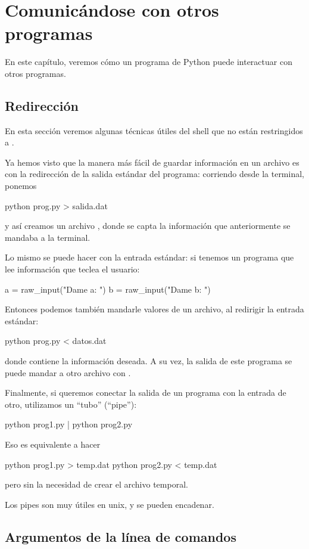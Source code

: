 \chapter{Comunicándose con otros programas}

En este capítulo, veremos cómo un programa de Python puede interactuar con otros programas.

\section{Redirección}

En esta sección veremos algunas técnicas útiles del shell  que no están restringidos a .

Ya hemos visto que la manera más fácil de guardar información en un archivo es con la redirección de la salida estándar del programa: corriendo desde la terminal, ponemos
\begin{python}
python prog.py > salida.dat
\end{python}
y así creamos un archivo , donde se capta la información que anteriormente se mandaba a la terminal.

Lo mismo se puede hacer con la entrada estándar: si tenemos un programa que lee información que teclea el usuario:
\begin{python}
a = raw_input("Dame a: ")
b = raw_input("Dame b: ")
\end{python}
Entonces podemos también mandarle valores de un archivo, al redirigir la entrada estándar:
\begin{python}
python prog.py < datos.dat
\end{python}
donde  contiene la información deseada.  A su vez, la salida de este programa se puede mandar a otro archivo con \inl{>}.

Finalmente, si queremos conectar la salida de un programa con la entrada de otro, utilizamos un ``tubo'' (``pipe''):
\begin{python}
python prog1.py | python prog2.py
\end{python}
Eso es equivalente a hacer
\begin{python}
python prog1.py > temp.dat
python prog2.py < temp.dat
\end{python}
pero sin la necesidad de crear el archivo temporal. 

Los pipes son muy útiles en unix, y se pueden encadenar.




\section{Argumentos de la línea de comandos}

